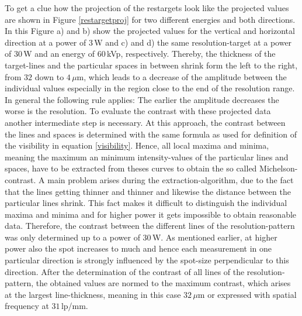 To get a clue how the projection of the \glspl{restarget} look like the projected values are shown in Figure \ref{restargetproj} for two different energies and both directions. In this Figure a) and b) show the projected values for the vertical and horizontal direction at a power of $3\,$W and c) and d) the same resolution-target at a power of $30\,$W and an energy of $60\,$kVp, respectively. Thereby, the thickness of the target-lines and the particular spaces in between shrink form the left to the right, from $32$ down to $4\, \mu$m, which leads to a decrease of the amplitude between the individual values especially in the region close to the end of the resolution range.\\
 
In general the following rule applies: The earlier the amplitude decreases the worse is the resolution. To evaluate the contrast with these projected data another intermediate step is necessary. At this approach, the contrast between the lines and spaces is determined with the same formula as used for definition of the visibility in equation \ref{visibility}. Hence, all local maxima and minima, meaning the maximum an minimum intensity-values of the particular lines and spaces, have to be extracted from theses curves to obtain the so called Michelson-contrast. A main problem arises during the extraction-algorithm, due to the fact that the lines getting thinner and thinner and likewise the distance between the particular lines shrink. This fact makes it difficult to distinguish the individual maxima and minima and for higher power it gets impossible to obtain reasonable data. Therefore, the contrast between the different lines of the resolution-pattern was only determined up to a power of $30\,$W. As mentioned earlier, at higher power also the spot increases to much and hence each measurement in one particular direction is strongly influenced by the spot-size perpendicular to this direction. After the determination of the contrast of all lines of the resolution-pattern, the obtained values are normed to the maximum contrast, which arises at the largest line-thickness, meaning in this case $32\, \mu$m or expressed with spatial frequency at $31\,$lp/mm.\\

